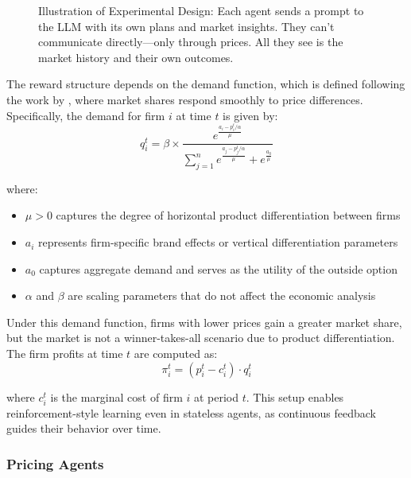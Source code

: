 \begin{figure}[H]
  \centering
  
    \caption{Illustration of Experimental Design: Each agent sends a prompt to the LLM with its own plans and market insights. They can't communicate directly—only through prices. All they see is the market history and their own outcomes.}
    \label{fig:experimental_design}
\end{figure}


The reward structure depends on the demand function, which is defined following the work by \textcite{calvano_artificial_2020}, where market shares respond smoothly to price differences. Specifically, the demand for firm $i$ at time $t$ is given by:
\begin{equation}
    q_i^t = \beta \times \frac{e^{\frac{a_i - p_i^t/\alpha}{\mu}}}{\sum_{j=1}^{n} e^{\frac{a_j - p_j^t/\alpha}{\mu}} + e^{\frac{a_0}{\mu}}}
\end{equation}

where:
\begin{itemize}
    \item $\mu > 0$ captures the degree of horizontal product differentiation between firms
    \item $a_i$ represents firm-specific brand effects or vertical differentiation parameters
    \item $a_0$ captures aggregate demand and serves as the utility of the outside option
    \item $\alpha$ and $\beta$ are scaling parameters that do not affect the economic analysis
\end{itemize}
Under this demand function, firms with lower prices gain a greater market share, but the market is not a winner-takes-all scenario due to product differentiation. The firm profits at time \( t \) are computed as: 
\begin{equation}
    \pi_i^t = (p_i^t - c_i^t) \cdot q_i^t
\end{equation}

where \( c_i^t \) is the marginal cost of firm \( i \) at period \( t \). This setup enables reinforcement-style learning even in stateless agents, as continuous feedback guides their behavior over time.

\subsubsection*{Pricing Agents}

